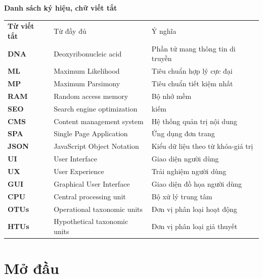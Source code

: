 \documentclass[12pt]{report}
\begin{document}
\newpage
{}
\begin{flushleft}
\bfseries{\Huge{Danh sách ký hiệu, chữ viết tắt}}
\end{flushleft}
\begin{table}[h]
	\centering
	\begin{tabular}{lll}
	    \textbf{Từ viết tắt}  & Từ đầy đủ & Ý nghĩa \\[0.3cm]
		\textbf{DNA}  & Deoxyribonucleic acid & Phần tử mang thông tin di truyền \\[0.3cm]
		\textbf{ML}  & Maximum Likelihood  & Tiêu chuẩn hợp lý cực đại \\[0.3cm]
		\textbf{MP}  & Maximum Parsimony & Tiêu chuẩn tiết kiệm nhất \\[0.3cm]
		\textbf{RAM}  & Random access memory & Bộ nhớ mềm \\[0.3cm]
		\textbf{SEO}  & Search engine optimization  & kiếm \\[0.3cm]
		\textbf{CMS}  & Content management system & Hệ thống quản trị nội dung \\[0.3cm]
		\textbf{SPA}  & Single Page Application & Ứng dụng đơn trang \\[0.3cm]
		\textbf{JSON}  & JavaScript Object Notation & Kiểu dữ liệu theo từ khóa-giá trị \\[0.3cm]
		\textbf{UI}  & User Interface  & Giao diện người dùng \\[0.3cm]
		\textbf{UX}  & User Experience  & Trải nghiệm người dùng \\[0.3cm]
		\textbf{GUI}  & Graphical User Interface & Giao diện đồ họa người dùng \\[0.3cm]
		\textbf{CPU}  & Central processing unit & Bộ xử lý trung tâm \\[0.3cm]
		\textbf{OTUs}  & Operational taxonomic units & Đơn vị phân loại hoạt động \\[0.3cm]
		\textbf{HTUs}  & Hypothetical taxonomic units & Đơn vị phân loại giả thuyết  \\[0.3cm]
	\end{tabular}
\end{table}

\newpage
{}
\listoffigures

\newpage
{}
\setcounter{page}{1}
\chapter{Mở đầu}
\label{chap:intro}
\end{document}
